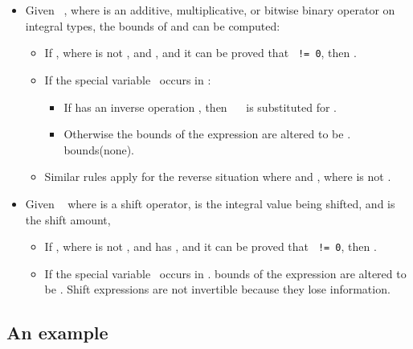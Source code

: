 \begin{itemize}
\item
  Given \texttt{  }, where  is an additive, multiplicative, or bitwise
  binary operator on integral types, the bounds of  and  can be
  computed:

  \begin{itemize}
  \item
    If , where  is not \boundsnone, and 
    , and it can be proved that \texttt{ != 0}, then
    .
  \item
    If the special variable \exprcurrentvalue\ occurs in :
    \begin{itemize}
    \item
      If  has an inverse operation , then 
      \texttt{\exprcurrentvalue\  }
      is substituted for \exprcurrentvalue.
    \item
      Otherwise the bounds of the expression are altered to be \boundsnone.
      bounds(none).
    \end{itemize}
  \item
    Similar rules apply for the reverse situation where 
    and , where  is not \boundsnone.
  \end{itemize}
\item
  Given \texttt{  } where  is a shift operator,  is the integral value
  being shifted, and  is the shift amount,

  \begin{itemize}
  \item
    If , where  is not \boundsnone, and  has
    \boundsnone, and it can be proved that \texttt{ != 0}, then .
  \item
    If the special variable \exprcurrentvalue\ occurs in .
    bounds of the expression are altered to be \boundsnone. Shift
    expressions are not invertible because they lose information.
  \end{itemize}
\end{itemize}

\subsection{An example}

